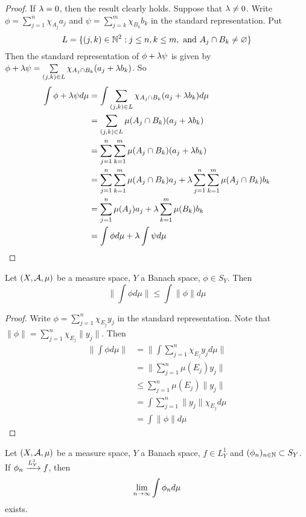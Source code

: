 \documentclass{book}
\begin{document}
	\begin{proof}
	If $\lambda =0$, then the result clearly holds. Suppose that $\lambda \neq 0$.	Write $\phi = \sum\limits_{j=1}^n\chi_{A_j}a_j$ and $\psi = \sum\limits_{j=k}^m\chi_{B_k}b_k$ in the standard representation. Put $$L = \{(j,k) \in \mathbb{N}^2: j \leq n, k \leq m, \text{ and } A_j \cap B_k \neq \varnothing\}$$ Then the standard representation of $\phi + \lambda \psi$ is given by  $\phi + \lambda \psi = \sum\limits_{(j,k) \in L} \chi_{A_j \cap B_k}(a_j + \lambda b_k)$.
	So 
	\begin{align*}
	\int \phi + \lambda \psi d \mu 
	&= \int \sum_{(j,k) \in L} \chi_{A_j \cap B_k}(a_j + \lambda b_k) d \mu \\
	&= \sum_{(j,k) \in L} \mu(A_j \cap B_k)(a_j + \lambda b_k) \\
	&= \sum_{j = 1}^n \sum_{k=1}^m \mu(A_j \cap B_k)(a_j + \lambda b_k)  \\ 
	&= \sum_{j = 1}^n \sum_{k=1}^m \mu(A_j \cap B_k)a_j + \lambda \sum_{j = 1}^n \sum_{k=1}^m \mu(A_j \cap B_k) b_k \\
	&= \sum_{j = 1}^n \mu(A_j)a_j +  \lambda\sum_{k=1}^m \mu(B_k) b_k \\
	&= \int \phi d \mu + \lambda \int \psi d\mu 
	\end{align*}
	\end{proof}

	\begin{ex}  
	Let $(X, \mathcal{A}, \mu)$ be a measure space, $Y$ a Banach space, $\phi \in S_Y$. Then $$\bigg \| \int \phi d\mu   \bigg \|  \leq \int \|\phi \| d \mu$$
	\end{ex}
	
	\begin{proof}
	Write $\phi = \sum\limits_{j=1}^n\chi_{E_j}y_j$ in the standard representation. Note that $\|\phi \| = \sum\limits_{j=1}^n\chi_{E_j} \|y_j\|$. Then 
	\begin{align*}
	\bigg \|  \int \phi d\mu  \bigg \| 
	&=  \bigg \|  \int \sum\limits_{j=1}^n\chi_{E_j}y_j  d\mu  \bigg \| \\
	&= \bigg \| \sum\limits_{j=1}^n \mu(E_j)y_j \bigg \| \\
	& \leq \sum\limits_{j=1}^n \mu(E_j) \|y_j \| \\
	&= \int \sum\limits_{j=1}^n \|y_j \| \chi_{E_j} d \mu \\
	&= \int \|\phi \| d\mu
	\end{align*}
	\end{proof}
	
	\begin{ex}  
	Let $(X, \mathcal{A}, \mu)$ be a measure space, $Y$ a Banach space, $f \in L^1_Y$ and $(\phi_n)_{n \in \mathbb{N}} \subset S_Y$. If $\phi_n \xrightarrow{L^1_Y} f$, then $$\lim \limits_{n \rightarrow \infty} \int \phi_n d\mu $$ exists.
	\end{ex}
	
\end{document}
